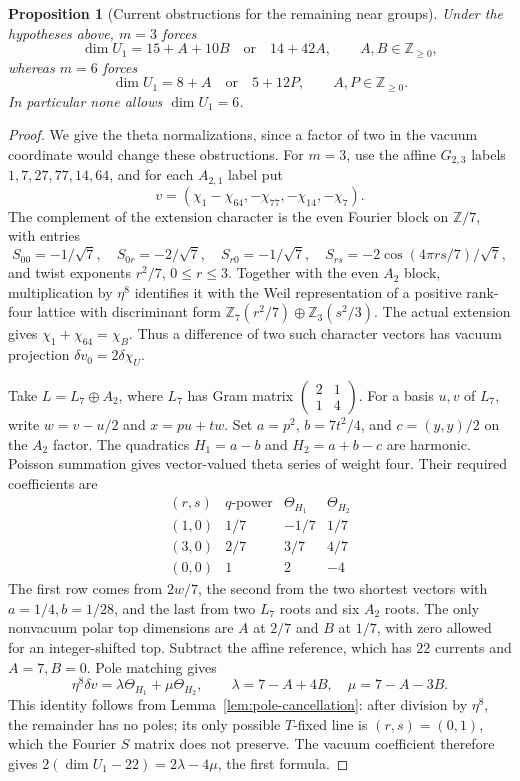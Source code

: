 \documentclass[11pt,a4paper]{article}
\newtheorem{proposition}[theorem]{Proposition}
\theoremstyle{definition}
\begin{document}
\begin{proposition}[Current obstructions for the remaining near groups]
\label{prop:near-group-current-obstructions}
Under the hypotheses above, $m=3$ forces
\[
 \dim U_1=15+A+10B\quad\text{or}\quad14+42A,
 \qquad A,B\in\mathbb Z_{\ge0},
\]
whereas $m=6$ forces
\[
 \dim U_1=8+A\quad\text{or}\quad5+12P,
 \qquad A,P\in\mathbb Z_{\ge0}.
\]
In particular none allows $\dim U_1=6$.
\end{proposition}
\begin{proof}
We give the theta normalizations, since a factor of two in the vacuum
coordinate would change these obstructions. For $m=3$, use the affine
$G_{2,3}$ labels $1,7,27,77,14,64$, and for each $A_{2,1}$ label put
\[
 v=(\chi_1-\chi_{64},-\chi_{77},-\chi_{14},-\chi_7).
\]
The complement of the extension character is the even Fourier block
on $\mathbb Z/7$, with entries
\[
 S_{00}=-1/\sqrt7,\quad S_{0r}=-2/\sqrt7,\quad
 S_{r0}=-1/\sqrt7,\quad
 S_{rs}=-2\cos(4\pi rs/7)/\sqrt7,
\]
and twist exponents $r^2/7$, $0\le r\le3$.
Together with the even $A_2$ block, multiplication by $\eta^8$
identifies it with the Weil representation of a positive rank-four
lattice with discriminant form
$\mathbb Z_7(r^2/7)\oplus\mathbb Z_3(s^2/3)$.
The actual extension gives $\chi_1+\chi_{64}=\chi_B$. Thus a
difference of two such character vectors has vacuum projection
$\delta v_0=2\delta\chi_U$.

Take $L=L_7\oplus A_2$, where $L_7$ has Gram matrix
$\left(\begin{smallmatrix}2&1\\1&4\end{smallmatrix}\right)$.
For a basis $u,v$ of $L_7$, write $w=v-u/2$ and $x=pu+tw$.
Set $a=p^2$, $b=7t^2/4$, and $c=(y,y)/2$ on the $A_2$ factor.
The quadratics $H_1=a-b$ and $H_2=a+b-c$ are harmonic.
Poisson summation gives vector-valued theta series of weight four.
Their required coefficients are
\[
\begin{array}{c|c|r|r}
 (r,s)&q\text{-power}&\Theta_{H_1}&\Theta_{H_2}\\\hline
 (1,0)&1/7&-1/7&1/7\\
 (3,0)&2/7&3/7&4/7\\
 (0,0)&1&2&-4
\end{array}
\]
The first row comes from $2w/7$, the second from the two shortest
vectors with $a=1/4,b=1/28$, and the last from two $L_7$ roots and
six $A_2$ roots. The only nonvacuum polar top dimensions are $A$ at
$2/7$ and $B$ at $1/7$, with zero allowed for an integer-shifted top.
Subtract the affine reference, which has $22$ currents and $A=7,B=0$.
Pole matching gives
\[
 \eta^8\delta v=\lambda\Theta_{H_1}+\mu\Theta_{H_2},\qquad
 \lambda=7-A+4B,\quad\mu=7-A-3B.
\]
This identity follows from Lemma~\ref{lem:pole-cancellation}: after
division by $\eta^8$, the remainder has no poles; its only possible
$T$-fixed line is $(r,s)=(0,1)$, which the Fourier $S$ matrix does
not preserve. The vacuum coefficient therefore gives
$2(\dim U_1-22)=2\lambda-4\mu$, the first formula.


\end{proof}
\end{document}
